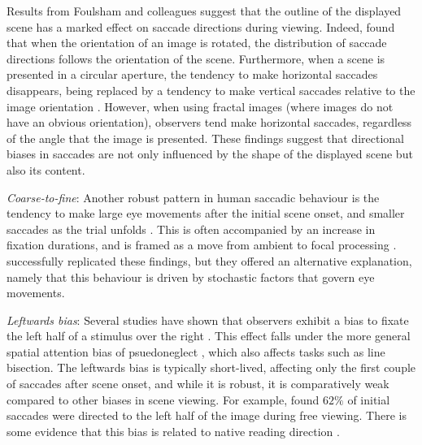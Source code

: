 Results from Foulsham and colleagues suggest that the outline of the displayed scene has a marked effect on saccade directions during viewing. Indeed, \cite{foulsham2008} found that when the orientation of an image is rotated, the distribution of saccade directions follows the orientation of the scene. Furthermore, when a scene is presented in a circular aperture, the tendency to make horizontal saccades disappears, being replaced by a tendency to make vertical saccades relative to the image orientation \citep{foulsham-kingstone2010}. However, when using fractal images (where images do not have an obvious orientation), observers tend make horizontal saccades, regardless of the angle that the image is presented. These findings suggest that directional biases in saccades are not only influenced by the shape of the displayed scene but also its content.

\textit{Coarse-to-fine}: Another robust pattern in human saccadic behaviour is the tendency to make large eye movements after the initial scene onset, and smaller saccades as the trial unfolds \citep{over2007, pannasch2008,antes1974}. This is often accompanied by an increase in fixation durations,  and is framed as a move from ambient to focal processing \citep{follet2011,velichkovsky2002,unema2005}. \cite{godwin2014} successfully replicated these findings, but they offered an alternative explanation, namely that this behaviour is driven by stochastic factors that govern eye movements.


\textit{Leftwards bias}: Several studies have shown that observers exhibit a bias to fixate the left half of a stimulus over the right \citep{ossandon2014,nuthmann-matthias2014,learmonth2015,zelinsky1996, brandt1945}. This effect falls under the more general spatial attention bias of psuedoneglect \citep{bowers-heilman1980}, which also affects tasks such as line bisection. The leftwards bias is typically short-lived, affecting only the first couple of saccades after scene onset, and while it is robust, it is comparatively weak compared to other biases in scene viewing. For example,  \cite{dickinson-intraub2009} found $62\%$ of initial saccades were directed to the left half of the image during free viewing. There is some evidence that this bias is related to native reading direction \citep{friedrich2014}.

